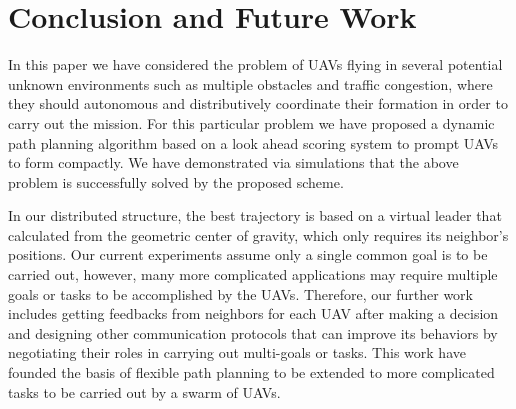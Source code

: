 \chapter{Conclusion and Future Work}

In this paper we have considered the problem of UAVs flying in several potential unknown environments such as multiple obstacles and traffic congestion, where they should autonomous and distributively coordinate their formation in order to carry out the mission. For this particular problem we have proposed a dynamic path planning algorithm based on a look ahead scoring system to prompt UAVs to form compactly. We have demonstrated via simulations that the above problem is successfully solved by the proposed scheme. 

In our distributed structure, the best trajectory is based on a virtual leader that calculated from the geometric center of gravity, which only requires its neighbor's positions. Our current experiments assume only a single common goal is to be carried out, however, many more complicated applications may require multiple goals or tasks to be accomplished by the UAVs. Therefore, our further work includes getting feedbacks from neighbors for each UAV after making a decision and designing other communication protocols that can improve its behaviors by negotiating their roles in carrying out multi-goals or tasks. This work have founded the basis of flexible path planning to be extended to more complicated tasks to be carried out by a swarm of UAVs.





